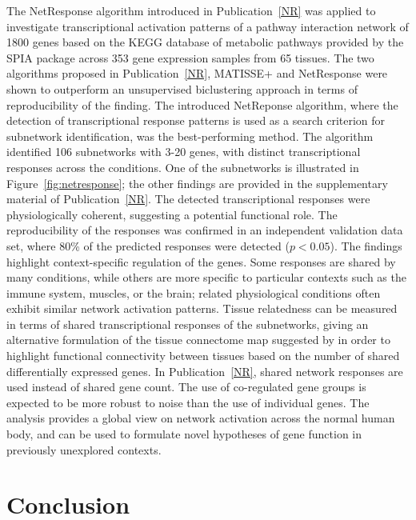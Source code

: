 The NetResponse algorithm introduced in Publication~\ref{NR} was
applied to investigate transcriptional activation patterns of a
pathway interaction network of 1800 genes based on the KEGG database
of metabolic pathways \citep{Kanehisa08} provided by the SPIA package
\citep{Tarca09} across 353 gene expression samples from 65
tissues. The two algorithms proposed in Publication~\ref{NR}, MATISSE+
and NetResponse were shown to outperform an unsupervised biclustering
approach in terms of reproducibility of the finding. The introduced
NetReponse algorithm, where the detection of transcriptional response
patterns is used as a search criterion for subnetwork identification,
was the best-performing method. The algorithm identified 106
subnetworks with 3-20 genes, with distinct transcriptional responses
across the conditions. One of the subnetworks is illustrated in
Figure~\ref{fig:netresponse}; the other findings are provided in the
supplementary material of Publication~\ref{NR}. The detected
transcriptional responses were physiologically coherent, suggesting a
potential functional role. The reproducibility of the responses was
confirmed in an independent validation data set, where 80\% of the
predicted responses were detected (\(p < 0.05\)). The findings
highlight context-specific regulation of the genes.  Some responses
are shared by many conditions, while others are more specific to
particular contexts such as the immune system, muscles, or the brain;
related physiological conditions often exhibit similar network
activation patterns. Tissue relatedness can be measured in terms of
shared transcriptional responses of the subnetworks, giving an
alternative formulation of the tissue connectome map suggested by
\cite{Greco08} in order to highlight functional connectivity between
tissues based on the number of shared differentially expressed genes.
In Publication~\ref{NR}, shared network responses are used instead of
shared gene count. The use of co-regulated gene groups is expected to
be more robust to noise than the use of individual genes.  The
analysis provides a global view on network activation across the
normal human body, and can be used to formulate novel hypotheses of
gene function in previously unexplored contexts.

\section{Conclusion}\label{sec:atlasconclusion}

